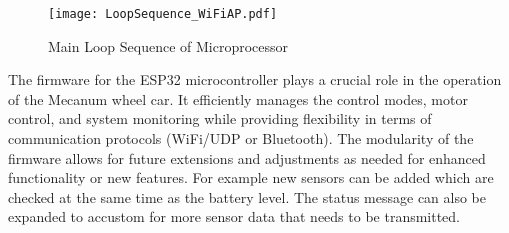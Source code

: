 \begin{figure}[h]
	\centering
	\captionsetup{justification=centering}
	\texttt{[image: LoopSequence\_WiFiAP.pdf]}
	\caption{Main Loop Sequence of Microprocessor}
	\label{fig:MainLoopSequence}
\end{figure}

The firmware for the ESP32 microcontroller plays a crucial role in the operation of the Mecanum wheel car. It efficiently manages the control modes, motor control, and system monitoring while providing flexibility in terms of communication protocols (WiFi/UDP or Bluetooth). The modularity of the firmware allows for future extensions and adjustments as needed for enhanced functionality or new features. For example new sensors can be added which are checked at the same time as the battery level. The status message can also be expanded to accustom for more sensor data that needs to be transmitted.